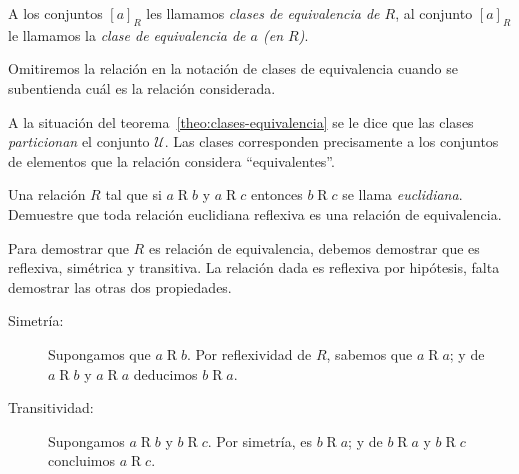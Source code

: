   \begin{definition}
    A los conjuntos \([a]_R\) les llamamos
    \emph{clases de equivalencia de \(R\)},
    al conjunto \([a]_R\) le llamamos
    la \emph{clase de equivalencia de \(a\) (en \(R\))}.
  \end{definition}
  Omitiremos la relación en la notación de clases de equivalencia
  cuando se subentienda cuál es la relación considerada.

  A la situación del teorema~\ref{theo:clases-equivalencia}
  se le dice que las clases \emph{particionan} el conjunto \(\mathcal{U}\).%
  Las clases corresponden precisamente
  a los conjuntos de elementos que la relación considera ``equivalentes''.
  \begin{example}
    Una relación \(R\) tal que si \(a \mathrel{R} b\) y \(a \mathrel{R} c\)
    entonces \(b \mathrel{R} c\) se llama \emph{euclidiana}.
    Demuestre que toda relación euclidiana reflexiva
    es una relación de equivalencia.

    Para demostrar que \(R\) es relación de equivalencia,
    debemos demostrar que es reflexiva,
    simétrica y transitiva.
    La relación dada es reflexiva por hipótesis,
    falta demostrar las otras dos propiedades.
    \begin{description}
    \item[Simetría:]
      Supongamos que \(a \mathrel{R} b\).
      Por reflexividad de \(R\),
      sabemos que \(a \mathrel{R} a\);
      y de \(a \mathrel{R} b\) y \(a \mathrel{R} a\)
      deducimos \(b \mathrel{R} a\).
    \item[Transitividad:]
      Supongamos \(a \mathrel{R} b\) y \(b \mathrel{R} c\).
      Por simetría,
      es \(b \mathrel{R} a\);
      y de \(b \mathrel{R} a\) y \(b \mathrel{R} c\)
      concluimos \(a \mathrel{R} c\).
    \end{description}
  \end{example}
